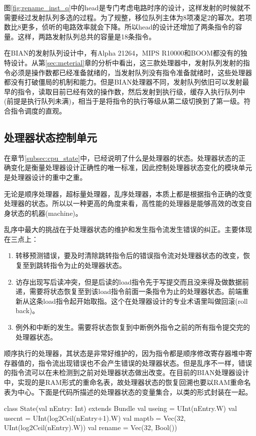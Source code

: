 图\ref{fig:rename_inst_q}中的head是专门考虑电路时序的设计，这样发射的时候就不需要经过发射队列多选的过程。为了规整，移位队列主体为8项凑足2的幂次。若项数比8更多，侦听的电路效率就会下降。所以head的设计还增加了两条指令的容量。这样，两路发射队列总共的容量是18条指令。

在BIAN的发射队列设计中，有Alpha 21264，MIPS R10000和BOOM都没有的独特设计。从第\ref{sec:meterial}章的分析中看出，这三款处理器中，发射队列发射的指令必须是操作数都已经准备就绪的，当发射队列没有指令准备就绪时，这些处理器都没有打破僵局的机制和能力。但是BIAN处理器不同，发射队列依旧可以发射最早的指令，读取目前已经有效的操作数，然后发射到执行级，缓存入执行队列中(前提是执行队列未满)，相当于是将指令的执行等级从第二级切换到了第一级。符合指令调度的直观。

\subsection{处理器状态控制单元}\label{subsec:state_unit}
在章节\ref{subsec:cpu_state}中，已经说明了什么是处理器的状态。处理器状态的正确变化是衡量处理器设计正确性的唯一标准，因此控制处理器状态变化的模块单元是处理器设计的重中之重。

无论是顺序处理器，超标量处理器，乱序处理器，本质上都是根据指令正确的改变处理器的状态。所以以一种更高的角度来看，高性能的处理器是能够高效的改变自身状态的机器(machine)。

乱序中最大的挑战在于处理器状态的维护和发生指令流发生错误的纠正。主要体现在三点上：
\begin{enumerate}[label=(\alph*)]
	\item 转移预测错误，要及时清除跳转指令后的错误指令流对处理器状态的改变，恢复至到跳转指令为止的处理器状态。
	\item 访存出现写后读冲突，但是后读的load指令先于写提交而且没来得及做数据前递，需要将状态恢复至到该load指令前面一条指令为止的处理器状态。前端重新从这条load指令起开始取指。这个在处理器设计的专业术语里叫做回滚(roll back)。
	\item 例外和中断的发生。需要将状态恢复到中断例外指令之前的所有指令提交完的处理器状态。
\end{enumerate}

顺序执行的处理器，其状态是非常好维护的，因为指令都是顺序修改寄存器堆中寄存器值的，指令流出现错误也不会产生错误的处理器状态。但是乱序不一样，错误的指令流可以在未检测到之前对处理器状态做出改变。在目前的BIAN处理器设计中，实现的是RAM形式的重命名表，故处理器状态的恢复回溯也要以RAM重命名表为中心。下面是代码所描述的处理器状态的变量集合，以类的形式封装在一起。
\begin{scala}
	class State(val nEntry: Int) extends Bundle {
		val useing = UInt(nEntry.W)
		val usecnt = UInt(log2Ceil(nEntry+1).W)
		val maptb  = Vec(32, UInt(log2Ceil(nEntry).W))
		val rename = Vec(32, Bool())
	}
\end{scala}
	
